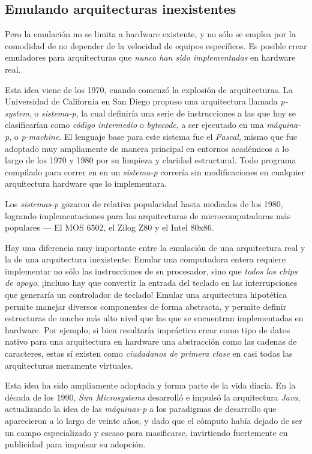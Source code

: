 \documentclass[11pt,fleqn]{book} %
\begin{document}
\subsection{Emulando arquitecturas inexistentes}
\label{sec-9-2-1}


Pero la emulación no se limita a hardware existente, y no sólo se
emplea por la comodidad de no depender de la velocidad de equipos
específicos. Es posible crear emuladores para arquitecturas que \emph{nunca han sido implementadas} en hardware real.

Esta idea viene de los 1970, cuando comenzó la explosión de
arquitecturas. La Universidad de California en San Diego propuso una
arquitectura llamada \emph{p-system}, o \emph{sistema-p}, la cual definiría una
serie de instrucciones a las que hoy se clasificarían como \emph{código intermedio} o
\emph{bytecode}, a ser ejecutado en una \emph{máquina-p}, o \emph{p-machine}. El
lenguaje base para este sistema fue el \emph{Pascal}, mismo que fue
adoptado muy ampliamente de manera principal en entornos académicos a
lo largo de los 1970 y 1980 por su limpieza y claridad
estructural. Todo programa compilado para correr en en un \emph{sistema-p}
correría sin modificaciones en cualquier arquitectura hardware que lo
implementara.

Los \emph{sistemas-p} gozaron de relativa popularidad hasta mediados de los
1980, logrando implementaciones para las arquitecturas de
microcomputadoras más populares — El MOS 6502, el Zilog Z80 y el Intel
80x86.

Hay una diferencia muy importante entre la emulación de una
arquitectura real y la de una arquitectura inexistente: Emular una
computadora entera requiere implementar no sólo las
instrucciones de su procesador, sino que \emph{todos los chips de apoyo},
¡incluso hay que convertir la entrada del teclado en las
interrupciones que generaría un controlador de teclado! Emular una
arquitectura hipotética permite manejar diversos componentes de forma
abstracta, y permite definir estructuras de mucho más alto nivel que
las que se encuentran implementadas en hardware. Por ejemplo, si bien
resultaría impráctico crear como tipo de datos nativo para una
arquitectura en hardware una abstracción como las cadenas de
caracteres, estas sí existen como \emph{ciudadanos de primera clase} en
casi todas las arquitecturas meramente virtuales.

Esta idea ha sido ampliamente adoptada y forma parte de
la vida diaria. En la década de los 1990, \emph{Sun Microsystems}
desarrolló e impulsó la arquitectura \emph{Java}, actualizando la idea de
las \emph{máquinas-p} a los paradigmas de desarrollo que aparecieron a lo
largo de veinte años, y dado que el cómputo había dejado de ser un campo
especializado y escaso para masificarse, invirtiendo fuertemente en
publicidad para impulsar su adopción.
\end{document}
